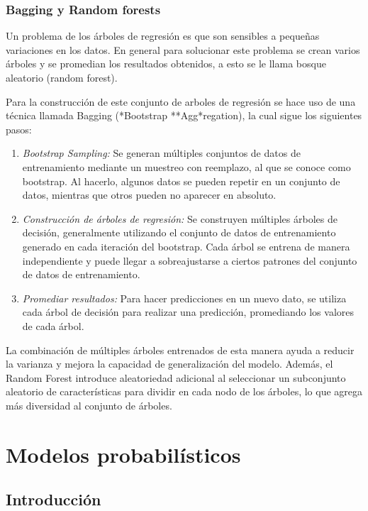 \documentclass[
]{book}
\begin{document}
\subsection{Bagging y Random forests}\label{bagging-y-random-forests}

Un problema de los árboles de regresión es que son sensibles a pequeñas
variaciones en los datos. En general para solucionar este problema se
crean varios árboles y se promedian los resultados obtenidos, a esto se
le llama bosque aleatorio (random forest).

Para la construcción de este conjunto de arboles de regresión se hace
uso de una técnica llamada Bagging (*Bootstrap **Agg*regation), la
cual sigue los siguientes pasos:

\begin{enumerate}
\def\labelenumi{\arabic{enumi}.}
\item
  \emph{Bootstrap Sampling:} Se generan múltiples conjuntos de datos de
  entrenamiento mediante un muestreo con reemplazo, al que se conoce
  como bootstrap. Al hacerlo, algunos datos se pueden repetir en un
  conjunto de datos, mientras que otros pueden no aparecer en
  absoluto.
\item
  \emph{Construcción de árboles de regresión:} Se construyen múltiples
  árboles de decisión, generalmente utilizando el conjunto de datos de
  entrenamiento generado en cada iteración del bootstrap. Cada árbol
  se entrena de manera independiente y puede llegar a sobreajustarse a
  ciertos patrones del conjunto de datos de entrenamiento.
\item
  \emph{Promediar resultados:} Para hacer predicciones en un nuevo dato, se
  utiliza cada árbol de decisión para realizar una predicción,
  promediando los valores de cada árbol.
\end{enumerate}

La combinación de múltiples árboles entrenados de esta manera ayuda a
reducir la varianza y mejora la capacidad de generalización del modelo.
Además, el Random Forest introduce aleatoriedad adicional al seleccionar
un subconjunto aleatorio de características para dividir en cada nodo de
los árboles, lo que agrega más diversidad al conjunto de árboles.

\chapter{Modelos probabilísticos}\label{modelos-probabiluxedsticos}

\section{Introducción}\label{introducciuxf3n}
\end{document}
